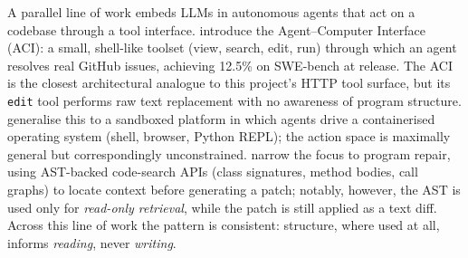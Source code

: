 A parallel line of work embeds LLMs in autonomous agents that act on a codebase
through a tool interface. \citet{sweagent2024} introduce the Agent--Computer
Interface (ACI): a small, shell-like toolset (view, search, edit, run) through
which an agent resolves real GitHub issues, achieving 12.5\% on SWE-bench at
release. The ACI is the closest architectural analogue to this project's HTTP
tool surface, but its \texttt{edit} tool performs raw text replacement with no
awareness of program structure. \citet{openhands2025} generalise this to a
sandboxed platform in which agents drive a containerised operating system
(shell, browser, Python REPL); the action space is maximally general but
correspondingly unconstrained. \citet{autocoderover2024} narrow the focus to
program repair, using AST-backed code-search APIs (class signatures, method
bodies, call graphs) to locate context before generating a patch; notably,
however, the AST is used only for \emph{read-only retrieval}, while the patch is
still applied as a text diff. Across this line of work the pattern is
consistent: structure, where used at all, informs \emph{reading}, never
\emph{writing}.

